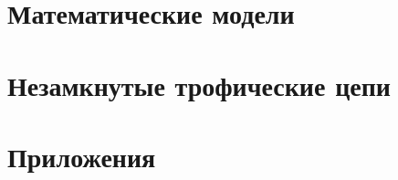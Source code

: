 \documentclass[
    14pt, 
    a4paper, 
    titlepage, 
    fleqn
]{extarticle}
\begin{document}
    
    
    \tableofcontents

    \pagebreak

    
    
    \pagebreak
    
    \section{Математические модели}
    

    \pagebreak

    

    \pagebreak

    \section{Незамкнутые трофические цепи}
    

    \pagebreak

    

    \pagebreak



    





    

    \pagebreak

    

    \pagebreak
    
    \section{Приложения}
    
\end{document}
